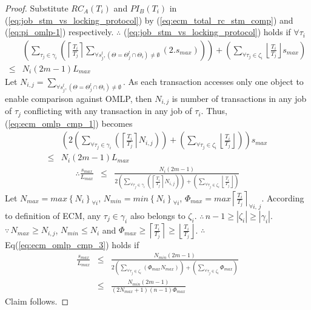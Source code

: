 \begin{proof}
%
Substitute $RC_{A}(T_{i})$ and $PI_{B}(T_{i})$ in (\ref{eq:job_stm_vs_locking_protocol})
by (\ref{eq:ecm_total_rc_stm_comp}) and (\ref{eq:pi_omlp-1})
respectively. $\therefore$ (\ref{eq:job_stm_vs_locking_protocol})
holds if $\forall \tau_i$
%
\begin{eqnarray}
 & \left(\sum_{\tau_{j}\in\gamma_{i}}\left(\left\lceil\frac{T_{i}}{T_{j}}\right\rceil\sum_{\forall s_{j}^{l}, \left(\Theta=\Theta_j^l \cap \Theta_i\right) \neq \emptyset}\left(2.s_{max}\right)\right)\right) +
\left( \sum_{\forall \tau_j \in \zeta_i} \left\lfloor \frac{T_i}{T_j}\right\rfloor s_{max} \right) \nonumber \\
\le & N_{i}\left(2m-1\right)L_{max}\label{eq:ecm_omlp_cmp_1}
\end{eqnarray}
%	
Let $N_{i,j}=\sum_{\forall s_{j}^{l}, \left(\Theta=\Theta_j^l \cap \Theta_i\right) \neq \emptyset}$. As each transaction accesses only one object to enable comparison against OMLP, then $N_{i,j}$ is number of transactions in any job of $\tau_{j}$ conflicting with any transaction in any job of $\tau_{i}$. Thus, (\ref{eq:ecm_omlp_cmp_1}) becomes 
%
\begin{eqnarray}
 & \left(2\left(\sum_{\forall\tau_{j}\in\gamma_{i}}\left(\left\lceil \frac{T_{i}}{T_{j}}\right\rceil N_{i,j}\right)\right)+\left(\sum_{\forall\tau_{j}\in\zeta_{i}}\left\lfloor \frac{T_{i}}{T_{j}}\right\rfloor \right)\right)s_{max}\nonumber \\
\le & N_{i}\left(2m-1\right)L_{max}\label{eq:ecm_omlp_cmp_2}
\end{eqnarray}
%
\begin{eqnarray}
\therefore \frac{s_{max}}{L_{max}} & \le & \frac{N_{i}\left(2m-1\right)}{2\left(\sum_{\forall\tau_{j}\in\gamma_{i}}\left(\left\lceil \frac{T_{i}}{T_{j}}\right\rceil N_{i,j}\right)\right)+\left(\sum_{\forall\tau_{j}\in\zeta_{i}}\left\lfloor \frac{T_{i}}{T_{j}}\right\rfloor \right)}\label{eq:ecm_omlp_cmp_3}
\end{eqnarray}
%
Let $N_{max}=max\left\{ N_{i}\right\}_{\forall i} $, $N_{min}=min\left\{ N_{i}\right\}_{\forall i} $,
$\Phi_{max}=max\left\lceil\frac{T_i}{T_j}\right\rceil_{\forall i,\,j}$. According to definition of ECM, any $\tau_{j}\in\gamma_{i}$ also
belongs to $\zeta_{i}$. $\therefore\, n-1 \ge |\zeta_{i}|\ge|\gamma_{i}|$.
$\because\, N_{max}\ge N_{i,j}$, $N_{min}\le N_{i}$ and $\Phi_{max}\ge\left\lceil \frac{T_{i}}{T_{j}}\right\rceil \ge\left\lfloor \frac{T_{i}}{T_{j}}\right\rfloor $.
$\therefore$ Eq(\ref{eq:ecm_omlp_cmp_3}) holds if 
%
\begin{eqnarray}
\frac{s_{max}}{L_{max}} & \le & \frac{N_{min}\left(2m-1\right)}{2\left(\sum_{\forall\tau_{j}\in\zeta_{i}}\left(\Phi_{max}N_{max}\right)\right)+\left(\sum_{\forall\tau_{j}\in\zeta_{i}}\Phi_{max}\right)}\nonumber \\
 & \le & \frac{N_{min}\left(2m-1\right)}{\left(2N_{max}+1\right)(n-1)\Phi_{max}}\label{eq:ecm_omlp_cmp_4}
\end{eqnarray}
%
Claim follows.
%
\end{proof}
%
